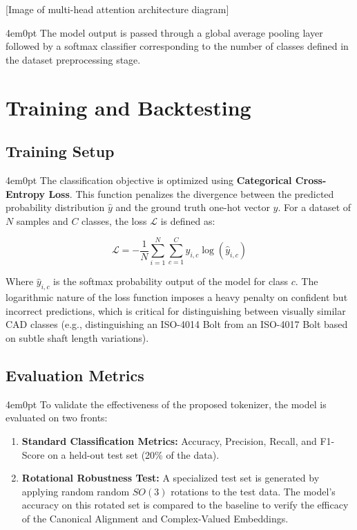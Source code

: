 	[Image of multi-head attention architecture diagram]
	
	\begin{indentedblock}{4em}{0pt}
		The model output is passed through a global average pooling layer followed by a softmax classifier corresponding to the number of classes defined in the dataset preprocessing stage.
		
	\end{indentedblock}

\section{Training and Backtesting}

	\subsection{Training Setup}
		\begin{indentedblock}{4em}{0pt}
			The classification objective is optimized using \textbf{Categorical Cross-Entropy Loss}. This function penalizes the divergence between the predicted probability distribution $\hat{y}$ and the ground truth one-hot vector $y$. For a dataset of $N$ samples and $C$ classes, the loss $\mathcal{L}$ is defined as:
			
			\begin{equation}
				\mathcal{L} = -\frac{1}{N} \sum_{i=1}^{N} \sum_{c=1}^{C} y_{i,c} \log(\hat{y}_{i,c})
			\end{equation}
			
			Where $\hat{y}_{i,c}$ is the softmax probability output of the model for class $c$. The logarithmic nature of the loss function imposes a heavy penalty on confident but incorrect predictions, which is critical for distinguishing between visually similar CAD classes (e.g., distinguishing an ISO-4014 Bolt from an ISO-4017 Bolt based on subtle shaft length variations).
		\end{indentedblock}

\subsection{Evaluation Metrics}
	\begin{indentedblock}{4em}{0pt}
		To validate the effectiveness of the proposed tokenizer, the model is evaluated on two fronts:
		\begin{enumerate}
			\item \textbf{Standard Classification Metrics:} Accuracy, Precision, Recall, and F1-Score on a held-out test set (20\% of the data).
			\item \textbf{Rotational Robustness Test:} A specialized test set is generated by applying random random $SO(3)$ rotations to the test data. The model's accuracy on this rotated set is compared to the baseline to verify the efficacy of the Canonical Alignment and Complex-Valued Embeddings.
		\end{enumerate}
	\end{indentedblock}